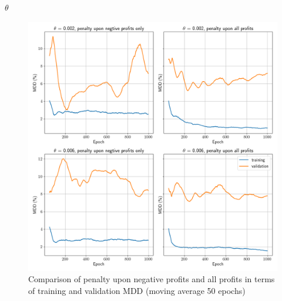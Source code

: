 $\theta$
\begin{figure}[ht]
  \includegraphics[width=15cm]{images/penalty_negtive_profits_compare.png}
  \caption [Comparison of penalty all profits and negative profits only] {Comparison of penalty upon negative profits and all profits in terms of training and validation MDD (moving average 50 epochs)}
  \label{fig:negtive_profits_diagram}
\end{figure}